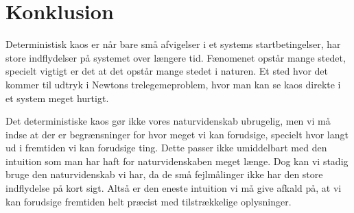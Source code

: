 \documentclass[12pt,a4paper]{article}
\theoremstyle{break}
\theoremstyle{nonumberplain}
\begin{document}
\section{Konklusion}
Deterministisk kaos er når bare små afvigelser i et systems startbetingelser, har store indflydelser på systemet over længere tid.
Fænomenet opstår mange stedet, specielt vigtigt er det at det opstår mange stedet i naturen. 
Et sted hvor det kommer til udtryk i Newtons trelegemeproblem, hvor man kan se kaos direkte i et system meget hurtigt.

Det deterministiske kaos gør ikke vores naturvidenskab ubrugelig, men vi må indse at der er begrænsninger for hvor meget vi kan forudsige, specielt hvor langt ud i fremtiden vi kan forudsige ting. 
Dette passer ikke umiddelbart med den intuition som man har haft for naturvidenskaben meget længe. 
Dog kan vi stadig bruge den naturvidenskab vi har, da de små fejlmålinger ikke har den store indflydelse på kort sigt. 
Altså er den eneste intuition vi må give afkald på, at vi kan forudsige fremtiden helt præcist med tilstrækkelige oplysninger.
\end{document}
